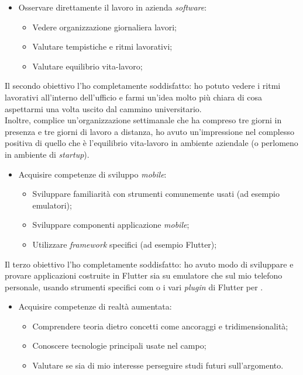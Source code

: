 \begin{itemize}
  \item Osservare direttamente il lavoro in azienda \textit{software}:
    \begin{itemize}
        \item Vedere organizzazione giornaliera lavori;
        \item Valutare tempistiche e ritmi lavorativi;
        \item Valutare equilibrio vita-lavoro;
    \end{itemize}
\end{itemize}

Il secondo obiettivo l'ho completamente soddisfatto: ho potuto vedere i ritmi lavorativi all'interno dell'ufficio e farmi un'idea molto più chiara di cosa aspettarmi una volta uscito dal cammino universitario.\\
Inoltre, complice un'organizzazione settimanale che ha compreso tre giorni in presenza e tre giorni di lavoro a distanza, ho avuto un'impressione nel complesso positiva di quello che è l'equilibrio vita-lavoro in ambiente aziendale (o perlomeno in ambiente di \textit{startup}).\\


\begin{itemize}
  \item Acquisire competenze di sviluppo \textit{mobile}:
        \begin{itemize}
            \item Sviluppare familiarità con strumenti comunemente usati (ad esempio emulatori);
            \item Sviluppare componenti applicazione \textit{mobile};
            \item Utilizzare \textit{framework} specifici (ad esempio Flutter);
        \end{itemize}
\end{itemize}

Il terzo obiettivo l'ho completamente soddisfatto: ho avuto modo di sviluppare e provare applicazioni costruite in Flutter sia su emulatore che sul mio telefono personale, usando strumenti specifici com \astudio{} o i vari \textit{plugin} di Flutter per \vsc{}.

\begin{itemize}
  \item Acquisire competenze di realtà aumentata:
        \begin{itemize}
            \item Comprendere teoria dietro concetti come ancoraggi e tridimensionalità;
            \item Conoscere tecnologie principali usate nel campo;
            \item Valutare se sia di mio interesse perseguire studi futuri sull'argomento.
        \end{itemize}
\end{itemize}

